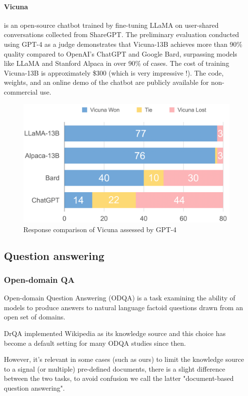 \documentclass[a4paper,12pt]{article}
\begin{document}
\paragraph*{Vicuna} \cite{vicuna} is an open-source chatbot trained by fine-tuning LLaMA \cite{llama} on user-shared conversations collected from ShareGPT. The preliminary evaluation conducted using GPT-4 as a judge demonstrates that Vicuna-13B achieves more than 90\% 
quality compared to OpenAI's ChatGPT and Google Bard, surpassing models like LLaMA \cite{llama} and Stanford Alpaca \cite{alpaca} in over 90\% of cases. 
The cost of training Vicuna-13B is approximately \$300 (which is very impressive !). The code, weights, and an online demo of the chatbot are publicly available for non-commercial use.

\begin{figure}[htbp]
	\centering
	\includegraphics[width=.5\linewidth]{figures/vicuna.png}
	\caption{Response comparison of Vicuna assessed by GPT-4}
	\label{fig:vicuna}
\end{figure}


\subsection{Question answering}
\subsubsection{Open-domain QA}
Open-domain Question Answering (ODQA) is a
task examining the ability of models to produce answers to natural language factoid questions drawn
from an open set of domains.

DrQA \cite{drqa} implemented Wikipedia as its knowledge source and this choice has become a default setting for many ODQA studies since then.

However, it's relevant in some cases (such as ours) to limit the knowledge source to a signal (or multiple) pre-defined documents, there is a slight difference between the two tasks, to avoid confusion we call the latter "document-based question answering". 
\end{document}
